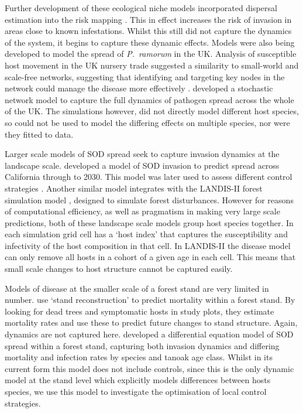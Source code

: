 Further development of these ecological niche models incorporated dispersal estimation into the risk mapping \citep{meentemeyer_early_2008}. This in effect increases the risk of invasion in areas close to known infestations. Whilst this still did not capture the dynamics of the system, it begins to capture these dynamic effects. Models were also being developed to model the spread of \emph{P.~ramorum} in the UK\@. Analysis of susceptible host movement in the UK nursery trade suggested a similarity to small-world and scale-free networks, suggesting that identifying and targeting key nodes in the network could manage the disease more effectively \citep{pautasso_epidemiological_2008, jeger_modelling_2007}. \citet{harwood_epidemiological_2009} developed a stochastic network model to capture the full dynamics of pathogen spread across the whole of the UK\@. The simulations however, did not directly model different host species, so could not be used to model the differing effects on multiple species, nor were they fitted to data.

Larger scale models of SOD spread seek to capture invasion dynamics at the landscape scale. \citet{meentemeyer_epidemiological_2011} developed a model of SOD invasion to predict spread across California through to 2030. This model was later used to assess different control strategies \citep{cunniffe_modelling_2016}. Another similar model \citep{tonini_modeling_2018} integrates with the LANDIS-II forest simulation model \citep{scheller_design_2007}, designed to simulate forest disturbances. However for reasons of computational efficiency, as well as pragmatism in making very large scale predictions, both of these landscape scale models group host species together. In \citet{meentemeyer_early_2008} each simulation grid cell has a `host index' that captures the susceptibility and infectivity of the host composition in that cell. In LANDIS-II the disease model can only remove all hosts in a cohort of a given age in each cell. This means that small scale changes to host structure cannot be captured easily.

Models of disease at the smaller scale of a forest stand are very limited in number. \citet{brown_forest_2009} use `stand reconstruction' to predict mortality within a forest stand. By looking for dead trees and symptomatic hosts in study plots, they estimate mortality rates and use these to predict future changes to stand structure. Again, dynamics are not captured here. \citet{cobb_ecosystem_2012} developed a differential equation model of SOD spread within a forest stand, capturing both invasion dynamics and differing mortality and infection rates by species and tanoak age class. Whilst in its current form this model does not include controls, since this is the only dynamic model at the stand level which explicitly models differences between hosts species, we use this model to investigate the optimisation of local control strategies.

